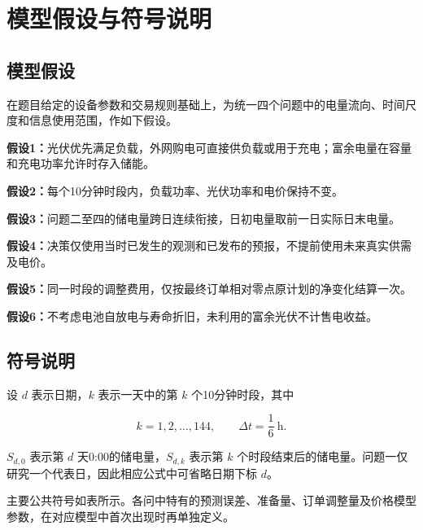 \section{模型假设与符号说明}

\subsection{模型假设}

在题目给定的设备参数和交易规则基础上，为统一四个问题中的电量流向、时间尺度和信息使用范围，作如下假设。

\noindent\textbf{假设1：}光伏优先满足负载，外网购电可直接供负载或用于充电；富余电量在容量和充电功率允许时存入储能。

\noindent\textbf{假设2：}每个10分钟时段内，负载功率、光伏功率和电价保持不变。

\noindent\textbf{假设3：}问题二至四的储电量跨日连续衔接，日初电量取前一日实际日末电量。

\noindent\textbf{假设4：}决策仅使用当时已发生的观测和已发布的预报，不提前使用未来真实供需及电价。

\noindent\textbf{假设5：}同一时段的调整费用，仅按最终订单相对零点原计划的净变化结算一次。

\noindent\textbf{假设6：}不考虑电池自放电与寿命折旧，未利用的富余光伏不计售电收益。

\subsection{符号说明}

设 $d$ 表示日期，$k$ 表示一天中的第 $k$ 个10分钟时段，其中

\begin{equation}
k=1,2,\ldots,144,
\qquad
\Delta t=\frac{1}{6}\ \mathrm{h}.
\end{equation}

$S_{d,0}$ 表示第 $d$ 天0:00的储电量，$S_{d,k}$ 表示第 $k$ 个时段结束后的储电量。问题一仅研究一个代表日，因此相应公式中可省略日期下标 $d$。

主要公共符号如表所示。各问中特有的预测误差、准备量、订单调整量及价格模型参数，在对应模型中首次出现时再单独定义。

